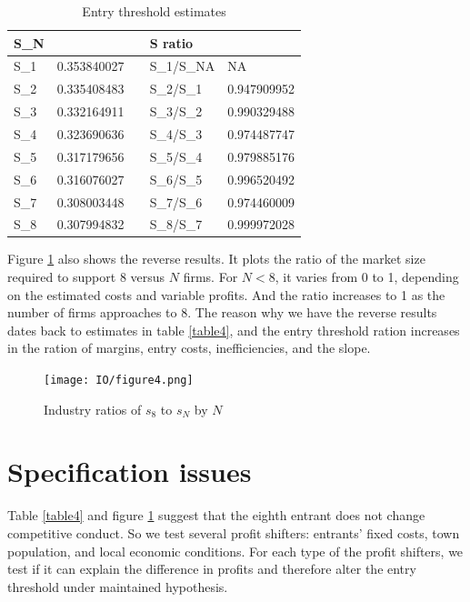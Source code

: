 \documentclass[a4paper,11pt]{article}
\begin{document}
\begin{table}[ht]
\centering
\setlength{\belowcaptionskip}{0.2cm}
\caption{Entry threshold estimates}
\label{table5}
\begin{tabular}{@{}lllll@{}}
\toprule
S\_N &             &  & S ratio    &             \\ \midrule
S\_1 & 0.353840027 &  & S\_1/S\_NA & NA          \\
S\_2 & 0.335408483 &  & S\_2/S\_1  & 0.947909952 \\
S\_3 & 0.332164911 &  & S\_3/S\_2  & 0.990329488 \\
S\_4 & 0.323690636 &  & S\_4/S\_3  & 0.974487747 \\
S\_5 & 0.317179656 &  & S\_5/S\_4  & 0.979885176 \\
S\_6 & 0.316076027 &  & S\_6/S\_5  & 0.996520492 \\
S\_7 & 0.308003448 &  & S\_7/S\_6  & 0.974460009 \\
S\_8 & 0.307994832 &  & S\_8/S\_7  & 0.999972028 \\ \bottomrule
\end{tabular}
\end{table}

Figure \ref{figure4} also shows the reverse results. It plots the ratio of the market size required to support 8 versus $N$ firms. For $N<8$, it varies from 0 to 1, depending on the estimated costs and variable profits. And the ratio increases to 1 as the number of firms approaches to 8. The reason why we have the reverse results dates back to estimates in table \ref{table4}, and the entry threshold ration increases in the ration of margins, entry costs, inefficiencies, and the slope.

\begin{figure}[ht]
    \centering
    \texttt{[image: IO/figure4.png]}
    \caption{Industry ratios of $s_8$ to $s_N$ by $N$}
    \label{figure4}
\end{figure}


\section{Specification issues}
Table \ref{table4} and figure \ref{figure4} suggest that the eighth entrant does not change competitive conduct. So we test several profit shifters: entrants' fixed costs, town population, and local economic conditions. For each type of the profit shifters, we test if it can explain the difference in profits and therefore alter the entry threshold under maintained hypothesis.
\end{document}
